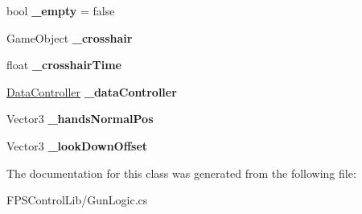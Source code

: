 \begin{DoxyCompactItemize}
\item 
\hypertarget{class_f_p_s_control_1_1_gun_logic_a4451d6951fa27e2cf523b6ccea902426}{bool {\bfseries \-\_\-empty} = false}\label{class_f_p_s_control_1_1_gun_logic_a4451d6951fa27e2cf523b6ccea902426}

\item 
\hypertarget{class_f_p_s_control_1_1_gun_logic_a01c73e1745459682f81017b66d7c8dfd}{Game\-Object {\bfseries \-\_\-crosshair}}\label{class_f_p_s_control_1_1_gun_logic_a01c73e1745459682f81017b66d7c8dfd}

\item 
\hypertarget{class_f_p_s_control_1_1_gun_logic_a26aec1391360eb43073c7a540bbb1f10}{float {\bfseries \-\_\-crosshair\-Time}}\label{class_f_p_s_control_1_1_gun_logic_a26aec1391360eb43073c7a540bbb1f10}

\item 
\hypertarget{class_f_p_s_control_1_1_gun_logic_af34e3960467ae97b298e2c110cbddabc}{\hyperlink{class_f_p_s_control_1_1_data_controller}{Data\-Controller} {\bfseries \-\_\-data\-Controller}}\label{class_f_p_s_control_1_1_gun_logic_af34e3960467ae97b298e2c110cbddabc}

\item 
\hypertarget{class_f_p_s_control_1_1_gun_logic_a9a8a9a34ba093fa9f9ce355581265b20}{Vector3 {\bfseries \-\_\-hands\-Normal\-Pos}}\label{class_f_p_s_control_1_1_gun_logic_a9a8a9a34ba093fa9f9ce355581265b20}

\item 
\hypertarget{class_f_p_s_control_1_1_gun_logic_af59dd778c4890dd33692db10f2b578b1}{Vector3 {\bfseries \-\_\-look\-Down\-Offset}}\label{class_f_p_s_control_1_1_gun_logic_af59dd778c4890dd33692db10f2b578b1}

\end{DoxyCompactItemize}


The documentation for this class was generated from the following file\-:\begin{DoxyCompactItemize}
\item 
F\-P\-S\-Control\-Lib/Gun\-Logic.\-cs\end{DoxyCompactItemize}
